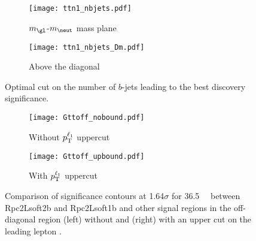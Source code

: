 
\begin{figure}
\centering
\begin{subfigure}[t]{0.48\textwidth}
\caption{$m_{\gl}$-$m_{\neut}$ mass plane}
\texttt{[image: ttn1\_nbjets.pdf]}
\end{subfigure}
\begin{subfigure}[t]{0.48\textwidth}
\caption{Above the diagonal}
\texttt{[image: ttn1\_nbjets\_Dm.pdf]}
\end{subfigure}
\caption{Optimal cut on the number of $b$-jets leading to the best discovery significance.
}
\label{fig:SR_Gtt_bjets}
\end{figure}







\begin{figure}
\centering
\begin{subfigure}[t]{0.49\textwidth}
\caption{Without $p_{\rm T}^{\ell_1}$ uppercut}
\texttt{[image: Gttoff\_nobound.pdf]}
\end{subfigure}
\begin{subfigure}[t]{0.49\textwidth}
\caption{With $p_{\rm T}^{\ell_1}$ uppercut}
\texttt{[image: Gttoff\_upbound.pdf]}
\end{subfigure}
\caption{Comparison of significance contours at 1.64$\sigma$ for 36.5~\ifb~ between Rpc2Lsoft2b and Rpc2Lsoft1b and other 
signal regions in the off-diagonal region (left) without and (right) with an upper cut on the leading lepton \pt.}
\label{fig:SR_ptbound}
\end{figure}

